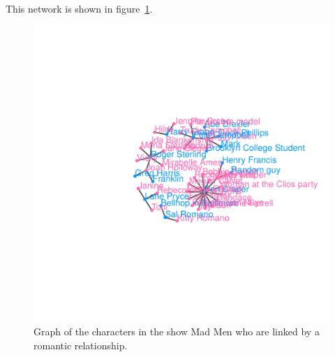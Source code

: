\documentclass[11pt]{article}\usepackage[]{graphicx}\usepackage[]{color}
\makeatletter
\newenvironment{kframe}{%
 \def\at@end@of@kframe{}%
 \ifinner\ifhmode%
  \def\at@end@of@kframe{\end{minipage}}%
  \begin{minipage}{\columnwidth}%
 \fi\fi%
 \def\FrameCommand##1{\hskip\@totalleftmargin \hskip-\fboxsep
 \colorbox{shadecolor}{##1}\hskip-\fboxsep
     \hskip-\linewidth \hskip-\@totalleftmargin \hskip\columnwidth}%
 \MakeFramed {\advance\hsize-\width
   \@totalleftmargin\z@ \linewidth\hsize
   \@setminipage}}%
 {\par\unskip\endMakeFramed%
 \at@end@of@kframe}
\newenvironment{knitrout}{}{} %
\makeatother
\begin{document}
This network is shown in figure~\ref{fig.cap:madmen_ex}.
\begin{knitrout}
\color{fgcolor}\begin{kframe}


{\ttfamily\noindent\bfseries{}}\end{kframe}
\end{knitrout}

\begin{figure}
\centering
\includegraphics[width=\textwidth]{figure/madmen_ex-1.pdf}
\caption{\label{fig.cap:madmen_ex} Graph of the characters in the show Mad Men who are linked by a romantic relationship.}
\end{figure}
\afterpage{\clearpage}
\end{document}
